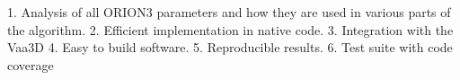 1. Analysis of all ORION3 parameters and how they are used in various parts of the algorithm.
2. Efficient implementation in native code.
3. Integration with the Vaa3D
4. Easy to build software.
5. Reproducible results.
6. Test suite with code coverage
